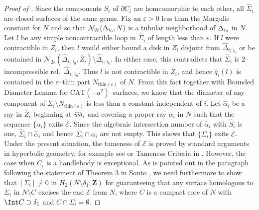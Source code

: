 \documentclass{gtart_a}
\def\S{Section }
\theoremstyle{definition}
\numberwithin{equation}{section}
\begin{document}
\begin{proof}[Proof of ]
Since the components $S_i$ of $\partial C_i$ are homeomorphic to each other, all $\hat \Sigma_i$ are closed 
surfaces of the same genus.
Fix an $\varepsilon >0$ less than the Margulis constant for $N$ and so that 
$\mathcal{N}_{2\varepsilon}(\Delta_{\smash{i_0}},N)$ is a tubular neighborhood of $\Delta_{\smash{i_0}}$ in $N$.
Let $l$ be any simple noncontractible loop in $\hat \Sigma_i$ of length less than $\varepsilon$.
If $l$ were contractible in $\overline Z_i$, then $l$ would either bound a disk in $\overline Z_i$ disjoint 
from $\hat \Delta_{i;\,i_0}$ or be contained in $\mathcal{N}_{2\varepsilon}(\hat \Delta_{i;\,i_0},\overline Z_i)
\setminus \hat\Delta_{i;\,i_0}$.
In either case, this contradicts that $\hat \Sigma_i$ is $2$--incompressible rel.\ $\hat \Delta_{i;\,i_0}$.
Thus $l$ is not contractible in $\overline Z_i$, and hence $\bar q_i(l)$ is contained in the 
$\varepsilon$--thin part $N_{\mathrm{thin}(\varepsilon)}$ of $N$.
From this fact together with Bounded Diameter Lemma \cite[Lemma 1.15]{cg} for $\mathrm{CAT}(-a^2)$--surfaces, 
we know that the diameter of any component of $\Sigma_i\setminus N_{\mathrm{thin}(\varepsilon)}$ is less than 
a constant independent of $i$.
Let $\hat \alpha_i$ be a ray in $\overline Z_i$ beginning at $\smash{\hat \delta}_i$ and covering a proper ray 
$\alpha_i$ in $N$ such that the sequence $\{\alpha_i\}$ exits $\mathcal{E}$.
Since the algebraic intersection number of $\hat\alpha_i$ with $\hat S_i$ is one, $\hat\Sigma_i\cap \hat\alpha_i$ 
and hence $\Sigma_i\cap \alpha_i$ are not empty.
This shows that $\{\Sigma_i\}$ exits $\mathcal{E}$.
Under the present situation, the tameness of $\mathcal{E}$ is proved by standard arguments in hyperbolic geometry, 
for example see \cite{bo,can,sou} or Tameness Criteria in \cite[\S 6]{cg}.
However, the case when $C_i$ is a handlebody is exceptional.
As is pointed out in the paragraph following the statement of Theorem 3 in Souto \cite{sou}, we need furthermore 
to show that $[\Sigma_i]\neq 0$ in $H_2(N\setminus \delta_1;\mathbf{Z})$ for guaranteeing that any 
surface homologous to $\Sigma_i$ in $N\setminus C$ excises the end $\mathcal{E}$ from $N$, where $C$ is a compact 
core of $N$ with $\Int C\supset \delta_1$ and $C\cap \Sigma_i=\emptyset$.




\end{proof}
\end{document}
